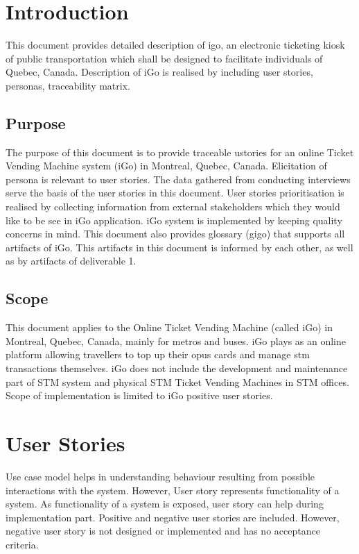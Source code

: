 \documentclass[11pt, english]{report}
\begin{document}
\newcommand{\CC}{C\nolinebreak\hspace{-.05em}\raisebox{.4ex}{\tiny\bf +}\nolinebreak\hspace{-.10em}\raisebox{.4ex}{\tiny\bf +}}
\def\CC{{C\nolinebreak[4]\hspace{-.05em}\raisebox{.4ex}{\tiny\bf ++}}}

\tableofcontents
\newpage

\chapter{Introduction}
This document provides detailed description of \gls{igo}, an electronic ticketing kiosk of public transportation which shall be designed to facilitate individuals of Quebec, Canada. Description of iGo is realised by including user stories, personas, traceability matrix.

\section{Purpose}
The purpose of this document is to provide traceable \gls{ustories} for an online Ticket Vending Machine system (iGo) in Montreal, Quebec, Canada. Elicitation of persona is relevant to user stories. The data gathered from conducting interviews serve the basis of the user stories in this document. User stories prioritisation is realised by collecting information from external stakeholders which they would like to be see in iGo application. iGo system is implemented by keeping quality concerns in mind. This document also provides glossary (\gls{gigo}) that supports all artifacts of iGo. This artifacts in this document is informed by each other, as well as by artifacts of deliverable 1.
\section{Scope}
This document applies to the Online Ticket Vending Machine (called iGo)  in Montreal, Quebec, Canada, mainly for metros and buses. iGo plays as an online platform  allowing  \gls{travellers}  to top up their \gls{opus} cards and manage \gls{stm} transactions themselves. iGo does not include the development and maintenance part of STM system and physical STM Ticket Vending Machines in STM offices. Scope of implementation is limited to iGo positive user stories.



\chapter{User Stories}
Use case model helps in understanding behaviour resulting from possible interactions with the system. However, User story represents functionality of a system\cite{userstoriesincontext}. As functionality of a system is exposed, user story can help during implementation part. Positive and negative user stories are included. However, negative user story is not designed or implemented and has no acceptance criteria\cite{}.
\end{document}
